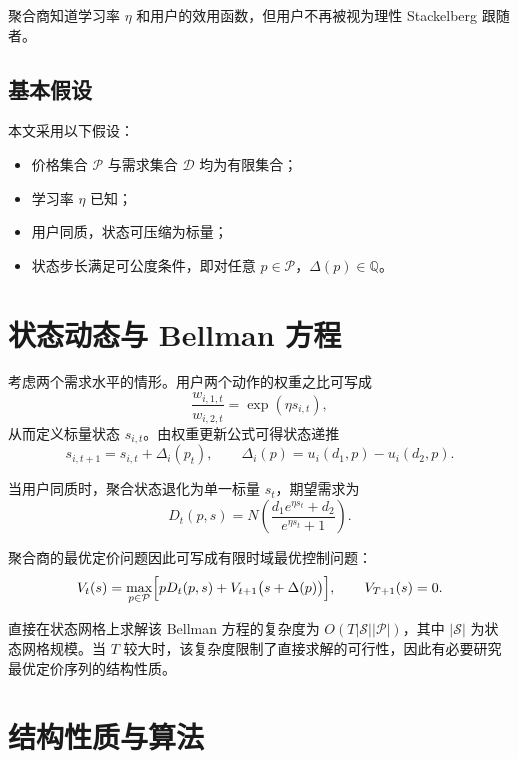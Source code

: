 \documentclass[UTF8]{ctexart}
\begin{document}
聚合商知道学习率 $\eta$ 和用户的效用函数，但用户不再被视为理性 Stackelberg 跟随者。

\subsection{基本假设}

本文采用以下假设：
\begin{itemize}
    \item 价格集合 $\mathcal{P}$ 与需求集合 $\mathcal{D}$ 均为有限集合；
    \item 学习率 $\eta$ 已知；
    \item 用户同质，状态可压缩为标量；
    \item 状态步长满足可公度条件，即对任意 $p \in \mathcal{P}$，$\Delta(p) \in \mathbb{Q}$。
\end{itemize}

\section{状态动态与 Bellman 方程}

考虑两个需求水平的情形。用户两个动作的权重之比可写成
\begin{equation}
    \frac{w_{i,1,t}}{w_{i,2,t}} = \exp(\eta s_{i,t}),
\end{equation}
从而定义标量状态 $s_{i,t}$。由权重更新公式可得状态递推
\begin{equation}
    s_{i,t+1} = s_{i,t} + \Delta_i(p_t),
\qquad
    \Delta_i(p) = u_i(d_1, p) - u_i(d_2, p).
\end{equation}

当用户同质时，聚合状态退化为单一标量 $s_t$，期望需求为
\begin{equation}
    D_t(p, s) = N \left( \frac{d_1 e^{\eta s_t} + d_2}{e^{\eta s_t} + 1} \right).
\end{equation}

聚合商的最优定价问题因此可写成有限时域最优控制问题：
\begin{equation}
    V_t(s) = \max_{p \in \mathcal{P}} \Bigl[ p D_t(p, s) + V_{t+1}\bigl(s + \Delta(p)\bigr) \Bigr],
\qquad
    V_{T+1}(s) = 0.
\end{equation}

直接在状态网格上求解该 Bellman 方程的复杂度为 $O(T |\mathcal{S}| |\mathcal{P}|)$，其中 $|\mathcal{S}|$ 为状态网格规模。当 $T$ 较大时，该复杂度限制了直接求解的可行性，因此有必要研究最优定价序列的结构性质。

\section{结构性质与算法}
\end{document}
